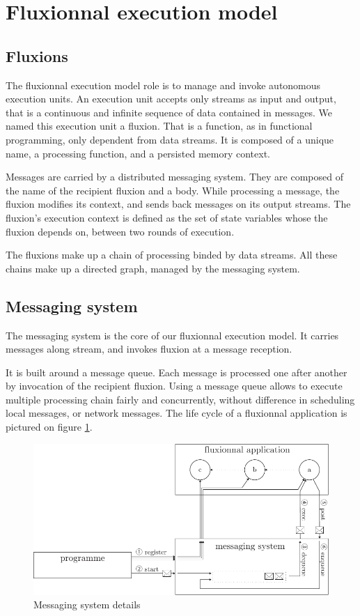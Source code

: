 \section{Fluxionnal execution model} \label{section:model}

\subsection{Fluxions}

The fluxionnal execution model role is to manage and invoke autonomous execution units.
An execution unit accepts only streams as input and output, that is a continuous and infinite sequence of data contained in messages.
We named this execution unit a fluxion.
That is a function, as in functional programming, only dependent from data streams.
It is composed of a unique name, a processing function, and a persisted memory context.

Messages are carried by a distributed messaging system.
They are composed of the name of the recipient fluxion and a body.
While processing a message, the fluxion modifies its context, and sends back messages on its output streams.
The fluxion's execution context is defined as the set of state variables whose the fluxion depends on, between two rounds of execution.

The fluxions make up a chain of processing binded by data streams.
All these chains make up a directed graph, managed by the messaging system.

\subsection{Messaging system}

The messaging system is the core of our fluxionnal execution model.
It carries messages along stream, and invokes fluxion at a message reception.

It is built around a message queue.
Each message is processed one after another by invocation of the recipient fluxion.
Using a message queue allows to execute multiple processing chain fairly and concurrently, without difference in scheduling local messages, or network messages.
The life cycle of a fluxionnal application is pictured on figure \ref{fig:MesSys}.

\begin{figure}[h!]
  \includegraphics[width=\linewidth]{ressources/schema-message.pdf}
  \caption{Messaging system details}
  \label{fig:MesSys}
\end{figure}

